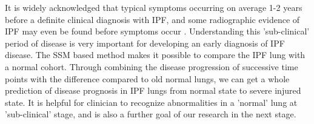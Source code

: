 It is widely acknowledged that typical symptoms occurring on average 1-2 years before a definite clinical diagnosis with IPF, and some radiographic evidence of IPF may even be found before symptoms occur \citep{raghu2011official, devaraj2014imaging}. Understanding this 'sub-clinical' period of disease is very important for developing an early diagnosis of IPF disease. The SSM based method makes it possible to compare the IPF lung with a normal cohort. Through combining the disease progression of successive time points with the difference compared to old normal lungs, we can get a whole prediction of disease prognosis in IPF lungs from normal state to severe injured state. It is helpful for clinician to recognize abnormalities in a 'normal' lung at 'sub-clinical' stage, and is also a further goal of our research in the next stage. 


